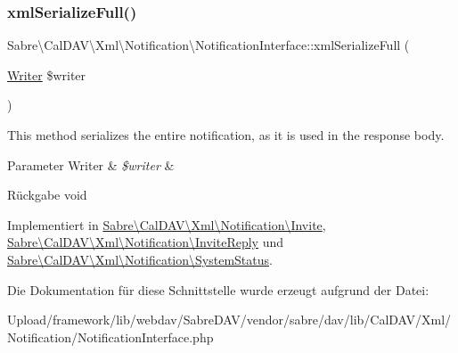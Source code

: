 \subsubsection{\texorpdfstring{xml\+Serialize\+Full()}{xmlSerializeFull()}}
{\footnotesize\ttfamily Sabre\textbackslash{}\+Cal\+D\+A\+V\textbackslash{}\+Xml\textbackslash{}\+Notification\textbackslash{}\+Notification\+Interface\+::xml\+Serialize\+Full (\begin{DoxyParamCaption}\item[{\mbox{\hyperlink{class_sabre_1_1_xml_1_1_writer}{Writer}}}]{\$writer }\end{DoxyParamCaption})}

This method serializes the entire notification, as it is used in the response body.


\begin{DoxyParams}[1]{Parameter}
Writer & {\em \$writer} & \\
\hline
\end{DoxyParams}
\begin{DoxyReturn}{Rückgabe}
void 
\end{DoxyReturn}


Implementiert in \mbox{\hyperlink{class_sabre_1_1_cal_d_a_v_1_1_xml_1_1_notification_1_1_invite_ac50ef5807224594c95d33d939e4f1bb3}{Sabre\textbackslash{}\+Cal\+D\+A\+V\textbackslash{}\+Xml\textbackslash{}\+Notification\textbackslash{}\+Invite}}, \mbox{\hyperlink{class_sabre_1_1_cal_d_a_v_1_1_xml_1_1_notification_1_1_invite_reply_a19d655167f7347b67647479132df9b6b}{Sabre\textbackslash{}\+Cal\+D\+A\+V\textbackslash{}\+Xml\textbackslash{}\+Notification\textbackslash{}\+Invite\+Reply}} und \mbox{\hyperlink{class_sabre_1_1_cal_d_a_v_1_1_xml_1_1_notification_1_1_system_status_a8b76f8c950f79690bafb0d7bc7069e6e}{Sabre\textbackslash{}\+Cal\+D\+A\+V\textbackslash{}\+Xml\textbackslash{}\+Notification\textbackslash{}\+System\+Status}}.



Die Dokumentation für diese Schnittstelle wurde erzeugt aufgrund der Datei\+:\begin{DoxyCompactItemize}
\item 
Upload/framework/lib/webdav/\+Sabre\+D\+A\+V/vendor/sabre/dav/lib/\+Cal\+D\+A\+V/\+Xml/\+Notification/Notification\+Interface.\+php\end{DoxyCompactItemize}
